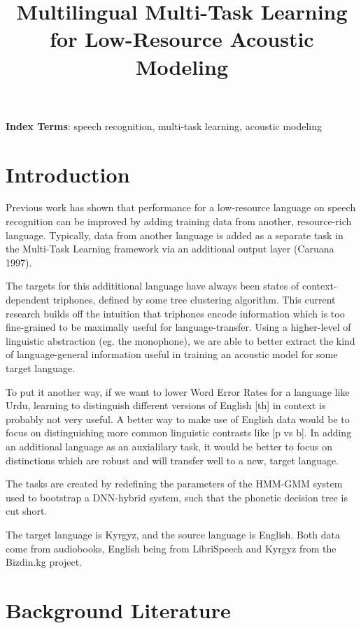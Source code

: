 \documentclass[a4paper]{article}
\title{Multilingual Multi-Task Learning for Low-Resource Acoustic Modeling}
\begin{document}
\maketitle
% 
\begin{abstract}
  
\end{abstract}
\noindent\textbf{Index Terms}: speech recognition, multi-task learning, acoustic modeling

\section{Introduction}

Previous work has shown that performance for a low-resource language on speech recognition can be improved by adding training data from another, resource-rich language. Typically, data from another language is added as a separate task in the Multi-Task Learning framework via an additional output layer (Caruana 1997).

The targets for this addititional language have always been states of context-dependent triphones, defined by some tree clustering algorithm. This current research builds off the intuition that triphones encode information which is too fine-grained to be maximally useful for language-transfer. Using a higher-level of linguistic abstraction (eg. the monophone), we are able to better extract the kind of language-general information useful in training an acoustic model for some target language.

To put it another way, if we want to lower Word Error Rates for a language like Urdu, learning to distinguish different versions of English [th] in context is probably not very useful. A better way to make use of English data would be to focus on distinguishing more common linguistic contrasts like [p vs b]. In adding an additional language as an auxialilary task, it would be better to focus on distinctions which are robust and will transfer well to a new, target language.


The tasks are created by redefining the parameters of the HMM-GMM system used to bootstrap a DNN-hybrid system, such that the phonetic decision tree is cut short.

The target language is Kyrgyz, and the source language is English. Both data come from audiobooks, English being from LibriSpeech and Kyrgyz from the Bizdin.kg project.




\section{Background Literature}
\end{document}
